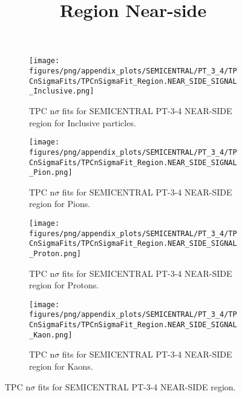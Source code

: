             \begin{figure}[H]
                \title{Region Near-side}
                \begin{subfigure}[b]{0.5\textwidth}
                    \centering
                    \texttt{[image: figures/png/appendix\_plots/SEMICENTRAL/PT\_3\_4/TPCnSigmaFits/TPCnSigmaFit\_Region.NEAR\_SIDE\_SIGNAL\_Inclusive.png]}
                    \caption{TPC n$\sigma$ fits for SEMICENTRAL PT-3-4 NEAR-SIDE region for Inclusive particles.}
                    \label{fig:appendix_SEMICENTRAL_PT-3-4_NEAR_SIDE_SIGNAL_Inclusive}
                \end{subfigure}
                \begin{subfigure}[b]{0.5\textwidth}
                    \centering
                    \texttt{[image: figures/png/appendix\_plots/SEMICENTRAL/PT\_3\_4/TPCnSigmaFits/TPCnSigmaFit\_Region.NEAR\_SIDE\_SIGNAL\_Pion.png]}
                    \caption{TPC n$\sigma$ fits for SEMICENTRAL PT-3-4 NEAR-SIDE region for Pions.}
                    \label{fig:appendix_SEMICENTRAL_PT-3-4_NEAR_SIDE_SIGNAL_Pion}
                \end{subfigure}
                \begin{subfigure}[b]{0.5\textwidth}
                    \centering
                    \texttt{[image: figures/png/appendix\_plots/SEMICENTRAL/PT\_3\_4/TPCnSigmaFits/TPCnSigmaFit\_Region.NEAR\_SIDE\_SIGNAL\_Proton.png]}
                    \caption{TPC n$\sigma$ fits for SEMICENTRAL PT-3-4 NEAR-SIDE region for Protons.}
                    \label{fig:appendix_SEMICENTRAL_PT-3-4_NEAR_SIDE_SIGNAL_Proton}
                \end{subfigure}
                \begin{subfigure}[b]{0.5\textwidth}
                    \centering
                    \texttt{[image: figures/png/appendix\_plots/SEMICENTRAL/PT\_3\_4/TPCnSigmaFits/TPCnSigmaFit\_Region.NEAR\_SIDE\_SIGNAL\_Kaon.png]}
                    \caption{TPC n$\sigma$ fits for SEMICENTRAL PT-3-4 NEAR-SIDE region for Kaons.}
                    \label{fig:appendix_SEMICENTRAL_PT-3-4_NEAR_SIDE_SIGNAL_Kaon}
                \end{subfigure}
                \caption{TPC n$\sigma$ fits for SEMICENTRAL PT-3-4 NEAR-SIDE region.}
                \label{fig:appendix_SEMICENTRAL_PT-3-4_NEAR_SIDE_SIGNAL}
            \end{figure}
